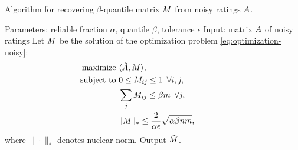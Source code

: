 \begin{algorithm}[b!]
\caption{Algorithm for recovering $\beta$-quantile matrix $\tilde{M}$ from 
noisy ratings $\tilde{A}$.}
\label{alg:recover-M}
\begin{algorithmic}[1]
\State Parameters: reliable fraction $\alpha$, quantile $\beta$, tolerance $\epsilon$
\State Input: matrix $\tilde{A}$ of noisy ratings
\State Let $\tilde{M}$ be the solution of the optimization problem \eqref{eq:optimization-noisy}:
  \begin{align}
  \label{eq:optimization-noisy}
  \text{maximize } &\langle \tilde{A}, M \rangle, \\
  \notag \text{ subject to } &0 \leq M_{ij} \leq 1 \,\,\, \forall i,j, \\
  \notag                     &\sum_{j} M_{ij} \leq \beta m \,\,\, \forall j, \\
  \notag                    &\|M\|_* \leq \frac{2}{\alpha\epsilon}\sqrt{\alpha\beta nm}, \phantom{xxxxxxx}
  \end{align}
  where $\|\cdot\|_*$ denotes nuclear norm.
\State Output $\tilde{M}$.
\end{algorithmic}
\end{algorithm}
